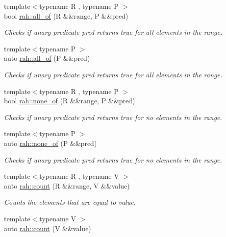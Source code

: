 \begin{DoxyCompactItemize}
{\footnotesize template$<$typename R , typename P $>$ }\\bool \mbox{\hyperlink{namespacerah_aaf7abb6066c8adfe6959691c3a3ea4e2}{rah\+::all\+\_\+of}} (R \&\&range, P \&\&pred)
\begin{DoxyCompactList}\small\item\em Checks if unary predicate pred returns true for all elements in the range. \end{DoxyCompactList}\item 
{\footnotesize template$<$typename P $>$ }\\auto \mbox{\hyperlink{namespacerah_a4066165c960917a330beeed75a0f96e7}{rah\+::all\+\_\+of}} (P \&\&pred)
\begin{DoxyCompactList}\small\item\em Checks if unary predicate pred returns true for all elements in the range. \end{DoxyCompactList}\item 
{\footnotesize template$<$typename R , typename P $>$ }\\bool \mbox{\hyperlink{namespacerah_a2a3ff8b7f73d480ac0827f9a41a3c92a}{rah\+::none\+\_\+of}} (R \&\&range, P \&\&pred)
\begin{DoxyCompactList}\small\item\em Checks if unary predicate pred returns true for no elements in the range. \end{DoxyCompactList}\item 
{\footnotesize template$<$typename P $>$ }\\auto \mbox{\hyperlink{namespacerah_aa05e58774ee8e9e05cd3e6ed2a2fa372}{rah\+::none\+\_\+of}} (P \&\&pred)
\begin{DoxyCompactList}\small\item\em Checks if unary predicate pred returns true for no elements in the range. \end{DoxyCompactList}\item 
{\footnotesize template$<$typename R , typename V $>$ }\\auto \mbox{\hyperlink{namespacerah_aa528865cc4a45d4eb276329554f16b4b}{rah\+::count}} (R \&\&range, V \&\&value)
\begin{DoxyCompactList}\small\item\em Counts the elements that are equal to value. \end{DoxyCompactList}\item 
{\footnotesize template$<$typename V $>$ }\\auto \mbox{\hyperlink{namespacerah_ae8400202fc4005dbade0f479dd556ec3}{rah\+::count}} (V \&\&value)

\end{DoxyCompactItemize}
